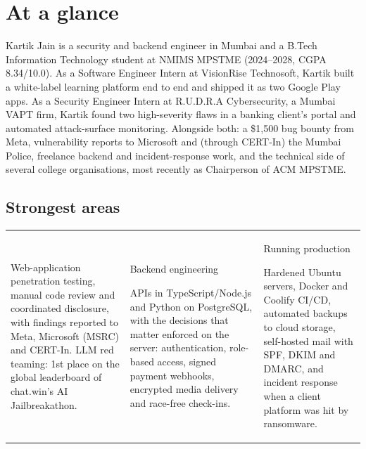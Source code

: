 \clearpage

\section*{At a glance}\label{sec:glance}

Kartik Jain is a security and backend engineer in Mumbai and a B.Tech Information Technology
student at NMIMS MPSTME (2024--2028, CGPA 8.34/10.0). As a Software Engineer Intern at VisionRise
Technosoft, Kartik built a white-label learning platform end to end and shipped it as two Google
Play apps. As a Security Engineer Intern at R.U.D.R.A Cybersecurity, a Mumbai VAPT firm, Kartik
found two high-severity flaws in a banking client's portal and automated attack-surface
monitoring. Alongside both: a \$1,500 bug bounty from Meta, vulnerability reports to Microsoft and
(through CERT-In) the Mumbai Police, freelance backend and incident-response work, and the technical
side of several college organisations, most recently as Chairperson of ACM MPSTME.

\subsection*{Strongest areas}
\vspace{2pt}
{\small
\renewcommand{\arraystretch}{1.0}%
\noindent\begin{tabularx}{\linewidth}{@{}>{\raggedright\arraybackslash}X@{\hspace{7mm}}>{\raggedright\arraybackslash}X@{\hspace{7mm}}>{\raggedright\arraybackslash}X@{}}
{\labelfont Application security}\par\vspace{2pt}
Web-application penetration testing, manual code review and coordinated disclosure, with
findings reported to Meta, Microsoft (MSRC) and CERT-In. LLM red teaming: 1st place on the global
leaderboard of chat.win's AI Jailbreakathon.
&
{ Backend engineering}\par\vspace{2pt}
APIs in TypeScript/Node.js and Python on PostgreSQL, with the decisions that matter enforced on
the server: authentication, role-based access, signed payment webhooks, encrypted media delivery
and race-free check-ins.
&
{ Running production}\par\vspace{2pt}
Hardened Ubuntu servers, Docker and Coolify CI/CD, automated backups to cloud storage, self-hosted
mail with SPF, DKIM and DMARC, and incident response when a client platform was hit by ransomware.
\end{tabularx}}

